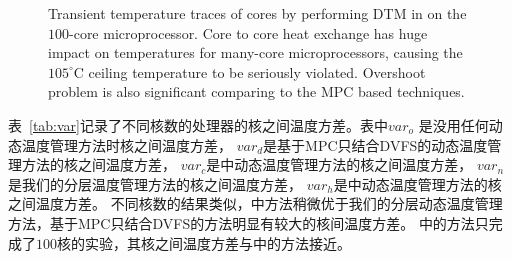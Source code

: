 \begin{figure}
  \centering
  \caption{Transient temperature traces of cores by performing DTM in
    \cite{Hanumaiah:TCAD'11} on the $100$-core
    microprocessor. Core to core heat exchange has huge impact on
    temperatures for many-core microprocessors, causing the
    $105^{\circ}$C ceiling temperature to be seriously violated. Overshoot
    problem is also significant comparing to the MPC based techniques.}\label{fig:magma}
\end{figure}

表~\ref{tab:var}记录了不同核数的处理器的核之间温度方差。表中$var_o$ 是没用任何动态温度管理方法时核之间温度方差，
$var_d$是基于MPC只结合DVFS的动态温度管理方法的核之间温度方差，
$var_c$是\cite{MaWang:APCCAS'14}中动态温度管理方法的核之间温度方差，
$var_n$是我们的分层温度管理方法的核之间温度方差，
$var_h$是\cite{Hanumaiah:TCAD'11}中动态温度管理方法的核之间温度方差。
不同核数的结果类似，\cite{MaWang:APCCAS'14}中方法稍微优于我们的分层动态温度管理方法，基于MPC只结合DVFS的方法明显有较大的核间温度方差。
\cite{Hanumaiah:TCAD'11}中的方法只完成了$100$核的实验，其核之间温度方差与\cite{MaWang:APCCAS'14}中的方法接近。

